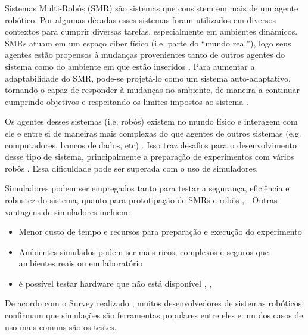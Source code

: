 Sistemas Multi-Robôs (SMR) são sistemas que consistem em mais de um agente robótico. Por algumas décadas esses sistemas foram utilizados em diversos contextos para cumprir diversas tarefas, especialmente em ambientes dinâmicos. SMRs atuam em um espaço ciber físico (i.e. parte do “mundo real”), logo seus agentes estão propensos à mudanças provenientes tanto de outros agentes do sistema como do ambiente em que estão inseridos \cite{iocchi2000reactivity}. Para aumentar a adaptabilidade do SMR, pode-se projetá-lo como um sistema auto-adaptativo, tornando-o capaz de responder à mudanças no ambiente, de maneira a continuar cumprindo objetivos e respeitando os limites impostos ao sistema \cite{sykes2010autonomous}.

Os agentes desses sistemas (i.e. robôs) existem no mundo físico e interagem com ele e entre si de maneiras mais complexas do que agentes de outros sistemas (e.g. computadores, bancos de dados, etc) \cite{cao1997cooperative}. Isso traz desafios para o desenvolvimento desse tipo de sistema, principalmente a preparação de experimentos com vários robôs \cite{noori20173d}. Essa dificuldade pode ser superada com o uso de simuladores.

Simuladores podem ser empregados tanto para testar a segurança, eficiência e robustez do sistema, quanto para prototipação de SMRs e robôs \cite{noori20173d}, \cite{pinciroli2012argos}. Outras vantagens de simuladores incluem: 

\begin{itemize}
    \item Menor custo de tempo e recursos para preparação e execução do experimento
    \item Ambientes simulados podem ser mais ricos, complexos e seguros que ambientes reais ou em laboratório \cite{robotSimulation}
    \item é possível testar hardware que não está disponível \cite{pinciroli2012argos},  \cite{echeverria2011morse}, \cite{robotSimulation}
\end{itemize}

De acordo com o Survey realizado \cite{robotSimulation}, muitos desenvolvedores de sistemas robóticos confirmam que simulações são ferramentas populares entre eles e um dos casos de uso mais comuns são os testes.

